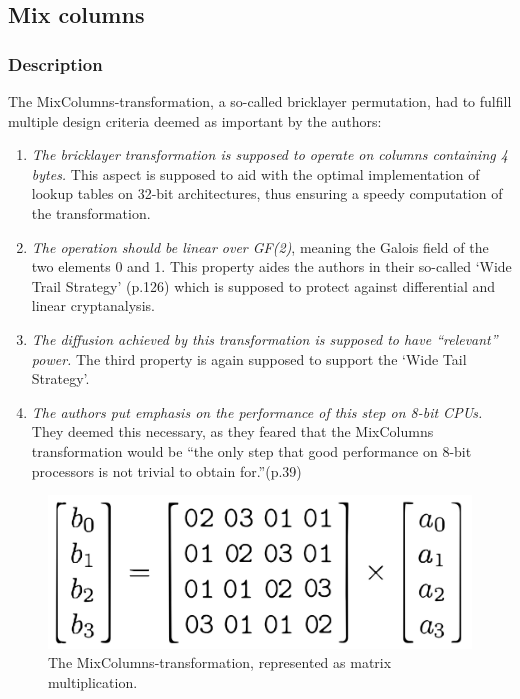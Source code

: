 \hypertarget{mix-columns}{%
\subsection{Mix columns}\label{mix-columns}}

\hypertarget{description-4}{%
\subsubsection{Description}\label{description-4}}

The MixColumns-transformation, a so-called bricklayer permutation, had to fulfill
\cite[p.39]{rijndael} multiple design criteria deemed as important by the authors:

\begin{enumerate}
\def\labelenumi{\arabic{enumi}.}

\item
  \emph{The bricklayer transformation is supposed to operate on columns
  containing 4 bytes.} This aspect is supposed to aid with the optimal
  implementation of lookup tables on 32-bit architectures, thus
  ensuring a speedy computation of the transformation.
\item
  \emph{The operation should be linear over GF(2)}, meaning the Galois
  field of the two elements 0 and 1. This property aides the authors in
  their so-called `Wide Trail Strategy' (p.126) which is supposed to
  protect against differential and linear cryptanalysis.
\item
  \emph{The diffusion achieved by this transformation is supposed to
  have ``relevant'' power.} The third property is again supposed to
  support the `Wide Tail Strategy'.
\item
  \emph{The authors put emphasis on the performance of this step on 8-bit
  CPUs.} They deemed this necessary, as they feared that the MixColumns
  transformation would be ``the only step that good performance on 8-bit
  processors is not trivial to obtain for.''(p.39)
\end{enumerate}


\begin{figure}
\centering
\includegraphics[scale = 0.2]{data/figures/mixcolumn.png}
\caption{The MixColumns-transformation, represented as matrix multiplication.}
\label{fig:mixcolumn}
\end{figure}

